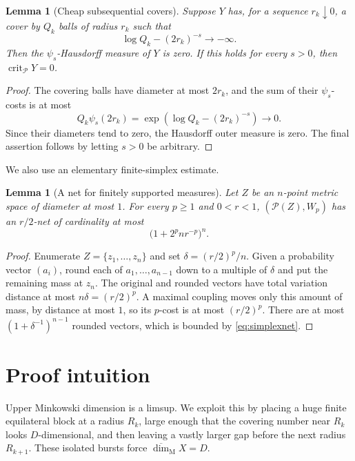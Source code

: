 \documentclass[11pt]{article}
\newtheorem{lemma}[theorem]{Lemma}
\newcommand{\Pcal}{\mathscr P}
\newcommand{\Prob}{\mathcal P}
\newcommand{\Mdim}{\overline{\dim}_{\mathrm M}}
\newcommand{\Wp}{W_p}
\begin{document}
\begin{lemma}[Cheap subsequential covers]\label{lem:gauge}
Suppose $Y$ has, for a sequence $r_k\downarrow0$, a cover by $Q_k$ balls of
radius $r_k$ such that
\[
       \log Q_k-(2r_k)^{-s}\longrightarrow-\infty.
\]
Then the $\psi_s$-Hausdorff measure of $Y$ is zero.  If this holds for every
$s>0$, then $\operatorname{crit}_{\Pcal}Y=0$.
\end{lemma}

\begin{proof}
The covering balls have diameter at most $2r_k$, and the sum of their
$\psi_s$-costs is at most
\[
 Q_k\psi_s(2r_k)
 =\exp\!\left(\log Q_k-(2r_k)^{-s}\right)\longrightarrow0.
\]
Since their diameters tend to zero, the Hausdorff outer measure is zero.
The final assertion follows by letting $s>0$ be arbitrary.
\end{proof}

We also use an elementary finite-simplex estimate.

\begin{lemma}[A net for finitely supported measures]\label{lem:simplex}
Let $Z$ be an $n$-point metric space of diameter at most $1$.  For every
$p\geq1$ and $0<r<1$, $(\Prob(Z),\Wp)$ has an $r/2$-net of cardinality at
most
\[
                  \bigl(1+2^p n r^{-p}\bigr)^n.
\tag{1}\label{eq:simplexnet}
\]
\end{lemma}

\begin{proof}
Enumerate $Z=\{z_1,\ldots,z_n\}$ and set
$\delta=(r/2)^p/n$.  Given a probability vector $(a_i)$, round each of
$a_1,\ldots,a_{n-1}$ down to a multiple of $\delta$ and put the remaining
mass at $z_n$.  The original and rounded vectors have total variation
distance at most $n\delta=(r/2)^p$.  A maximal coupling moves only this
amount of mass, by distance at most $1$, so its $p$-cost is at most
$(r/2)^p$.  There are at most $(1+\delta^{-1})^{n-1}$ rounded vectors,
which is bounded by \eqref{eq:simplexnet}.
\end{proof}

\section{Proof intuition}

Upper Minkowski dimension is a limsup.  We exploit this by placing a huge
finite equilateral block at a radius $R_k$, large enough that the covering
number near $R_k$ looks $D$-dimensional, and then leaving a vastly larger
gap before the next radius $R_{k+1}$.  These isolated bursts force
$\Mdim X=D$.
\end{document}
